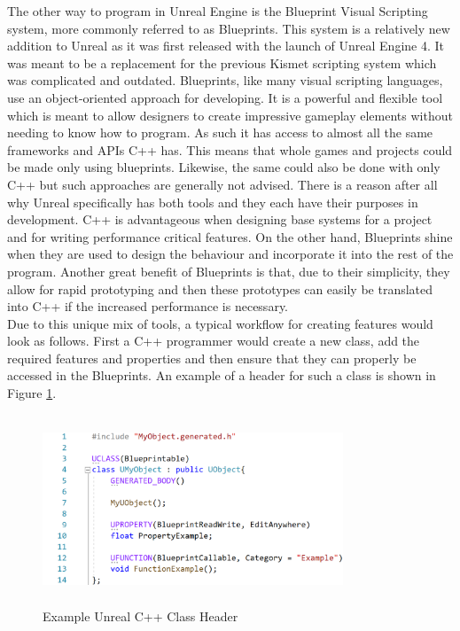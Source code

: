 The other way to program in Unreal Engine is the Blueprint Visual Scripting system, more commonly referred to as Blueprints\cite{bib:UEBlueprints}. This system is a relatively new addition to Unreal as it was first released with the launch of Unreal Engine 4. It was meant to be a replacement for the previous Kismet scripting system which was complicated and outdated\cite{bib:UEBlueChanges}. Blueprints, like many visual scripting languages, use an object-oriented approach for developing. It is a powerful and flexible tool which is meant to allow designers to create impressive gameplay elements without needing to know how to program\cite{bib:UEBlueprints}. As such it has access to almost all the same frameworks and APIs C++ has. This means that whole games and projects could be made only using blueprints. Likewise, the same could also be done with only C++ but such approaches are generally not advised. There is a reason after all why Unreal specifically has both tools and they each have their purposes in development. C++ is advantageous when designing base systems for a project and for writing performance critical features. On the other hand, Blueprints shine when they are used to design the behaviour and incorporate it into the rest of the program. Another great benefit of Blueprints is that, due to their simplicity, they allow for rapid prototyping and then these prototypes can easily be translated into C++ if the increased performance is necessary.\\
Due to this unique mix of tools, a typical workflow for creating features would look as follows. First a C++ programmer would create a new class, add the required features and properties and then ensure that they can properly be accessed in the Blueprints. An example of a header for such a class is shown in Figure \ref{fig:ClassExample}.
\begin{figure}[htpb]
	\centering
	\includegraphics[width=0.8\textwidth,height=160pt]{fig/ClassExample3.png}
	\caption[Example Unreal C++ Class Header]{Example Unreal C++ Class Header\protect}
	\label{fig:ClassExample}
\end{figure}
